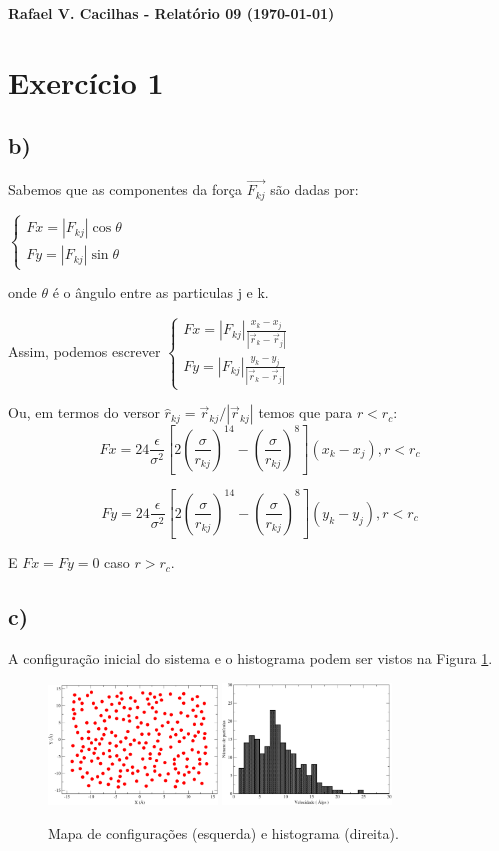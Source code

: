 \documentclass[a4wide]{report}
\begin{document}
\noindent
{\bf Rafael V. Cacilhas  - Relatório 09 (\today)}

\vspace{0.5cm}

\section*{Exercício 1}


\subsection*{b) }
Sabemos  que as componentes da força $\vec{F_{kj}}$ são dadas por:

$\begin{cases} 
Fx = |F_{kj}|\cos\theta \\ 
Fy = |F_{kj}|\sin\theta
\end{cases} $

onde $\theta$ é o ângulo entre as particulas j e k.

Assim, podemos escrever
$\begin{cases} 
Fx = |F_{kj}|\frac{x_k - x_j}{|\vec{r}_k - \vec{r}_j|} \\ 
Fy = |F_{kj}|\frac{y_k - y_j}{|\vec{r}_k - \vec{r}_j|}
\end{cases} $


Ou, em termos do versor $\hat{r}_{kj} = \vec{r}_{kj}/|\vec{r}_{kj}|$ temos que para $r < r_c$:
\begin{equation}
Fx = 24\frac{\epsilon}{\sigma^2} \left[ 2\left( \frac{\sigma}{r_{kj}}\right)^{14} - \left(\frac{\sigma}{r_{kj}}\right)^8     \right](x_k - x_j), r < r_c
\end{equation}

\begin{equation}
Fy = 24\frac{\epsilon}{\sigma^2} \left[ 2\left( \frac{\sigma}{r_{kj}}\right)^{14} - \left(\frac{\sigma}{r_{kj}}\right)^8     \right](y_k - y_j), r < r_c
\end{equation}

E $Fx = Fy = 0$ caso $r > r_c$.


\subsection*{c) }

A configuração inicial do sistema e o histograma podem ser vistos na Figura \ref{2b1}.

\begin{figure}[!htb]
\centering
\includegraphics[width=0.4\textwidth]{mapa.pdf}
\includegraphics[width=0.4\textwidth]{hist.pdf}
\caption{Mapa de configurações (esquerda) e histograma (direita).}
\label{2b1}
\end{figure}
\end{document}
